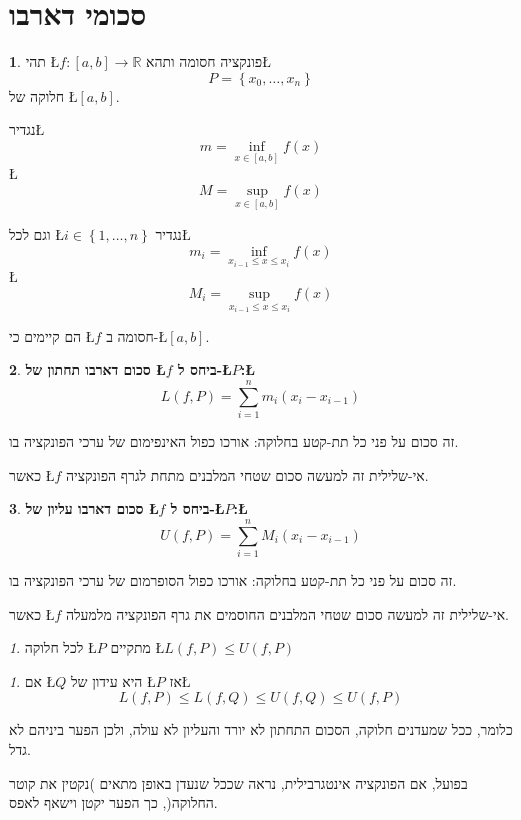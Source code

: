 \documentclass[english,hebrew]{article}
\theoremstyle{remark}
\theoremstyle{definition}
\newtheorem*{defn*}{\protect\definitionname}
\theoremstyle{plain}
\theoremstyle{remark}
\newtheorem{claim}[thm]{\protect\claimname}
\theoremstyle{plain}
\theoremstyle{plain}
\providecommand{\claimname}{טענה}
\providecommand{\definitionname}{הגדרה}
\begin{document}
\section{סכומי דארבו}
\begin{defn*}
תהי \L{$f:\left[a,b\right]\rightarrow\mathbb{R}$} פונקציה חסומה ותהא\L{%
\[
P=\left\{ x_{0},\dots,x_{n}\right\} 
\]
}%
 חלוקה של \L{$\left[a,b\right]$}.

נגדיר\L{%
\[
m=\underset{x\in\left[a,b\right]}{\inf}f(x)
\]
}%
\L{%
\[
M=\underset{x\in\left[a,b\right]}{\sup}f(x)
\]
}%

וגם לכל \L{$i\in\left\{ 1,\dots,n\right\} $} נגדיר\L{%
\[
m_{i}=\underset{x_{i-1}\le x\le x_{i}}{\inf}f(x)
\]
}%
\L{%
\[
M_{i}=\underset{x_{i-1}\le x\le x_{i}}{\sup}f(x)
\]
}%

הם קיימים כי \L{$f$} חסומה ב-\L{$\left[a,b\right]$}.
\end{defn*}
\begin{defn*}
\textbf{סכום דארבו תחתון של \L{$f$} ביחס ל-\L{$P$}:\L{%
\[
L\left(f,P\right)=\underset{i=1}{\overset{n}{\sum}}m_{i}\left(x_{i}-x_{i-1}\right)
\]
}%
}

זה סכום על פני כל תת-קטע בחלוקה: אורכו כפול האינפימום של ערכי הפונקציה
בו.

כאשר \L{$f$} אי-שלילית זה למעשה סכום שטחי המלבנים מתחת לגרף הפונקציה.
\end{defn*}
\begin{defn*}
\textbf{סכום דארבו עליון של \L{$f$} ביחס ל-\L{$P$}:\L{%
\[
U\left(f,P\right)=\underset{i=1}{\overset{n}{\sum}}M_{i}\left(x_{i}-x_{i-1}\right)
\]
}%
}

זה סכום על פני כל תת-קטע בחלוקה: אורכו כפול הסופרמום של ערכי הפונקציה
בו.

כאשר \L{$f$} אי-שלילית זה למעשה סכום שטחי המלבנים החוסמים את גרף
הפונקציה מלמעלה.
\end{defn*}
\begin{claim}
לכל חלוקה \L{$P$} מתקיים \L{$L\left(f,P\right)\le U\left(f,P\right)$}
\end{claim}

\begin{claim}
אם \L{$Q$} היא עידון של \L{$P$} אז\L{%
\[
L\left(f,P\right)\le L\left(f,Q\right)\le U\left(f,Q\right)\le U\left(f,P\right)
\]
}%

כלומר, ככל שמעדנים חלוקה, הסכום התחתון לא יורד והעליון לא עולה, ולכן
הפער ביניהם לא גדל. 

בפועל, אם הפונקציה אינטגרבילית, נראה שככל שנעדן באופן מתאים )נקטין
את קוטר החלוקה(, כך הפער יקטן וישאף לאפס.
\end{claim}
\end{document}
